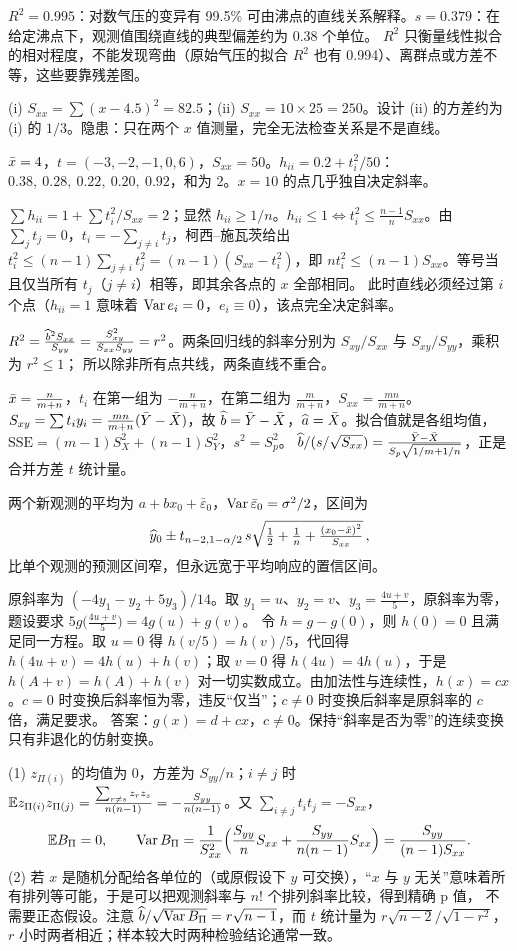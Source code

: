 $R^2=0.995$：对数气压的变异有 99.5\% 可由沸点的直线关系解释。$s=0.379$：在给定沸点下，观测值围绕直线的典型偏差约为 $0.38$ 个单位。
$R^2$ 只衡量线性拟合的相对程度，不能发现弯曲（原始气压的拟合 $R^2$ 也有 0.994）、离群点或方差不等，这些要靠残差图。

(i) $S_{xx}=\sum(x-4.5)^2=82.5$；(ii) $S_{xx}=10\times25=250$。设计 (ii) 的方差约为 (i) 的 $1/3$。隐患：只在两个 $x$ 值测量，完全无法检查关系是不是直线。

$\bar{x}=4$，$t=(-3,-2,-1,0,6)$，$S_{xx}=50$。$h_{ii}=0.2+t_i^2/50$：$0.38,\ 0.28,\ 0.22,\ 0.20,\ 0.92$，和为 $2$。$x=10$ 的点几乎独自决定斜率。

$\sum h_{ii}=1+\sum t_i^2/S_{xx}=2$；显然 $h_{ii}\ge1/n$。$h_{ii}\le1\iff t_i^2\le\frac{n-1}{n}S_{xx}$。由 $\sum_jt_j=0$，$t_i=-\sum_{j\ne i}t_j$，柯西–施瓦茨给出
$t_i^2\le(n-1)\sum_{j\ne i}t_j^2=(n-1)(S_{xx}-t_i^2)$，即 $nt_i^2\le(n-1)S_{xx}$。等号当且仅当所有 $t_j$（$j\ne i$）相等，即其余各点的 $x$ 全部相同。
此时直线必须经过第 $i$ 个点（$h_{ii}=1$ 意味着 $\operatorname{Var} e_i=0$，$e_i\equiv0$），该点完全决定斜率。

$R^2=\frac{\widehat{b}^2S_{xx}}{S_{yy}}=\frac{S_{xy}^2}{S_{xx}S_{yy}}=r^2$。两条回归线的斜率分别为 $S_{xy}/S_{xx}$ 与 $S_{xy}/S_{yy}$，乘积为 $r^2\le1$；
所以除非所有点共线，两条直线不重合。

$\bar{x}=\frac{n}{m+n}$，$t_i$ 在第一组为 $-\frac{n}{m+n}$，在第二组为 $\frac{m}{m+n}$，$S_{xx}=\frac{mn}{m+n}$。
$S_{xy}=\sum t_iy_i=\frac{mn}{m+n}(\bar{Y}-\bar{X})$，故 $\widehat{b}=\bar{Y}-\bar{X}$，$\widehat{a}=\bar{X}$。拟合值就是各组均值，$\mathrm{SSE}=(m-1)S_X^2+(n-1)S_Y^2$，$s^2=S_p^2$。
$\widehat{b}/(s/\sqrt{S_{xx}})=\frac{\bar{Y}-\bar{X}}{S_p\sqrt{1/m+1/n}}$，正是合并方差 $t$ 统计量。

两个新观测的平均为 $a+bx_0+\bar\varepsilon_0$，$\operatorname{Var}\bar\varepsilon_0=\sigma^2/2$，区间为
\[
\widehat{y}_0\pm t_{n-2,1-\alpha/2}\,s\sqrt{\tfrac12+\tfrac1n+\tfrac{(x_0-\bar{x})^2}{S_{xx}}}\,,
\]
比单个观测的预测区间窄，但永远宽于平均响应的置信区间。

原斜率为 $(-4y_1-y_2+5y_3)/14$。取 $y_1=u$、$y_2=v$、$y_3=\frac{4u+v}5$，原斜率为零，题设要求 $5g\big(\frac{4u+v}{5}\big)=4g(u)+g(v)$。
令 $h=g-g(0)$，则 $h(0)=0$ 且满足同一方程。取 $u=0$ 得 $h(v/5)=h(v)/5$，代回得 $h(4u+v)=4h(u)+h(v)$；取 $v=0$ 得 $h(4u)=4h(u)$，于是
$h(A+v)=h(A)+h(v)$ 对一切实数成立。由加法性与连续性，$h(x)=cx$。$c=0$ 时变换后斜率恒为零，违反“仅当”；$c\ne0$ 时变换后斜率是原斜率的 $c$ 倍，满足要求。
答案：$g(x)=d+cx$，$c\ne0$。保持“斜率是否为零”的连续变换只有非退化的仿射变换。

(1) $z_{\Pi(i)}$ 的均值为 $0$，方差为 $S_{yy}/n$；$i\ne j$ 时 $\mathbb{E} z_{\Pi(i)}z_{\Pi(j)}=\frac{\sum_{r\ne s}z_rz_s}{n(n-1)}=-\frac{S_{yy}}{n(n-1)}$。又 $\sum_{i\ne j}t_it_j=-S_{xx}$，
\[
\mathbb{E} B_\Pi=0,\qquad \operatorname{Var} B_\Pi=\frac{1}{S_{xx}^2}\Big(\frac{S_{yy}}{n}S_{xx}+\frac{S_{yy}}{n(n-1)}S_{xx}\Big)=\frac{S_{yy}}{(n-1)S_{xx}}.
\]
(2) 若 $x$ 是随机分配给各单位的（或原假设下 $y$ 可交换），“$x$ 与 $y$ 无关”意味着所有排列等可能，于是可以把观测斜率与 $n!$ 个排列斜率比较，得到精确 p 值，
不需要正态假设。注意 $\widehat{b}/\sqrt{\operatorname{Var} B_\Pi}=r\sqrt{n-1}$，而 $t$ 统计量为 $r\sqrt{n-2}/\sqrt{1-r^2}$，$r$ 小时两者相近；样本较大时两种检验结论通常一致。
